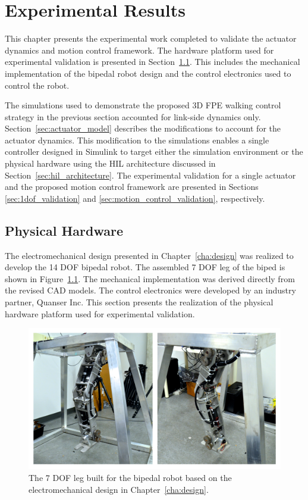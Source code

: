 \chapter{Experimental Results} %
\label{cha:experiments}

This chapter presents the experimental work completed to validate the actuator dynamics and motion control framework. The hardware platform used for experimental validation is presented in Section~\ref{sec:physical_hardware}. This includes the mechanical implementation of the bipedal robot design and the control electronics used to control the robot. 

The simulations used to demonstrate the proposed 3D FPE walking control strategy in the previous section accounted for link-side dynamics only. Section~\ref{sec:actuator_model} describes the modifications to account for the actuator dynamics. This modification to the simulations enables a single controller designed in Simulink to target either the simulation environment or the physical hardware using the HIL architecture discussed in Section~\ref{sec:hil_architecture}. The experimental validation for a single actuator and the proposed motion control framework are presented in Sections \ref{sec:1dof_validation} and \ref{sec:motion_control_validation}, respectively. 

\section{Physical Hardware} %
\label{sec:physical_hardware}
The electromechanical design presented in Chapter~\ref{cha:design} was realized to develop the 14 DOF bipedal robot. The assembled 7 DOF leg of the biped is shown in Figure~\ref{fig:bipedleg}. The mechanical implementation was derived directly from the revised CAD models. The control electronics were developed by an industry partner, Quanser Inc. This section presents the realization of the physical hardware platform used for experimental validation. 

\begin{figure}[!h]
	\centering
    \includegraphics[scale=0.39]{fig/hardware/bipedleg.png} 
  	\caption{The 7 DOF leg built for the bipedal robot based on the electromechanical design in Chapter~\ref{cha:design}.}
	\label{fig:bipedleg}
\end{figure}

